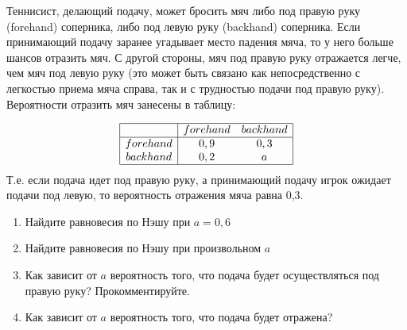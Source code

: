 \begin{problem}
\begin{source}
\cite[4.18]{gintis:gte}
\end{source}
Теннисист, делающий подачу, может бросить мяч либо под правую руку (forehand) соперника, либо под левую руку (backhand) соперника. Если принимающий подачу заранее угадывает место падения мяча, то у него больше шансов отразить мяч. С другой стороны, мяч под правую руку отражается легче, чем мяч под левую руку (это может быть связано как непосредственно с легкостью приема мяча справа, так и с трудностью подачи под правую руку). Вероятности отразить мяч занесены в таблицу:\par
\[\begin{array}{|c|cc|}
\hline
{} & {forehand} & {backhand} \\
\hline {forehand} & {0,9} & {0,3} \\
{backhand} & {0,2} & {a} \\
\hline
\end{array}\]
Т.е. если подача идет под правую руку, а принимающий подачу игрок ожидает подачи под левую, то вероятность отражения мяча равна 0,3.
\begin{enumerate}
\item  Найдите равновесия по Нэшу при  $a=0,6$\par
\item Найдите равновесия по Нэшу при произвольном  $a$\par
\item  Как зависит от  $a$  вероятность того, что подача будет осуществляться под правую руку? Прокомментируйте.\par
\item Как зависит от  $a$  вероятность того, что подача будет отражена?\par
\end{enumerate}


\begin{sol}

\end{sol}
\end{problem}






